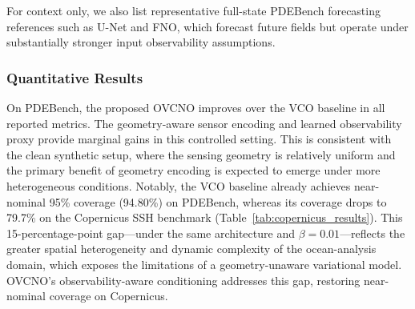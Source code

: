 \documentclass[11pt,a4paper]{article}
\begin{document}
For context only, we also list representative full-state PDEBench forecasting references such as U-Net and FNO, which forecast future fields but operate under substantially stronger input observability assumptions.

\subsubsection{Quantitative Results}

\begin{table}[!htbp]
\centering
\caption{Results on PDEBench. Full-state forecasting references are shown only for context and are not directly comparable to causal sparse-boundary forecasting models.}
\label{tab:pdebench_results}
\vspace{4pt}
\end{table}

On PDEBench, the proposed OVCNO improves over the VCO baseline in all reported metrics. The geometry-aware sensor encoding and learned observability proxy provide marginal gains in this controlled setting. This is consistent with the clean synthetic setup, where the sensing geometry is relatively uniform and the primary benefit of geometry encoding is expected to emerge under more heterogeneous conditions. Notably, the VCO baseline already achieves near-nominal 95\% coverage (94.80\%) on PDEBench, whereas its coverage drops to 79.7\% on the Copernicus SSH benchmark (Table~\ref{tab:copernicus_results}). This 15-percentage-point gap---under the same architecture and $\beta{=}0.01$---reflects the greater spatial heterogeneity and dynamic complexity of the ocean-analysis domain, which exposes the limitations of a geometry-unaware variational model. OVCNO's observability-aware conditioning addresses this gap, restoring near-nominal coverage on Copernicus.
\end{document}
